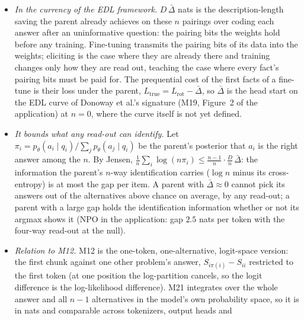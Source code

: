 \documentclass[11pt]{article}
\newenvironment{steps}{\begin{itemize}[nosep,leftmargin=1.2em,topsep=2pt]}{\end{itemize}}
\begin{document}
\begin{enumerate}[label=\textbf{M\arabic*}, leftmargin=*, itemsep=1.2em, resume]
{\begin{steps}
pairing is cheaper than its question and its answer predict). The gap is therefore invariant to
anything the parent does with a question alone (a prompt-dependent shift, an output broken on this
format) or with an answer alone (vocabulary, length, frequency, a penalty on the forbidden
answers); the four rotations run are a Monte-Carlo sample of $\bar\Delta$, their spread the noise
level. The identity is checked on a random model through the rotation and loss code
(\texttt{test\_rotation\_gap\_is\_the\_off\_diagonal\_mean}).
\item \emph{In the currency of the EDL framework.} $D\,\bar\Delta$ nats is the description-length
saving the parent already achieves on these $n$ pairings over coding each answer after an
uninformative question: the pairing bits the weights hold before any training. Fine-tuning
transmits the pairing bits of its data into the weights; eliciting is the case where they are
already there and training changes only how they are read out, teaching the case where every
fact's pairing bits must be paid for. The prequential cost of the first facts of a fine-tune is
their loss under the parent, $L_{\mathrm{true}}=L_{\mathrm{rot}}-\bar\Delta$, so $\bar\Delta$ is
the head start on the EDL curve of Donoway et al.'s signature (M19, Figure~2 of the application)
at $n=0$, where the curve itself is not yet defined.
\item \emph{It bounds what any read-out can identify.} Let
$\pi_i=p_\theta(a_i\mid q_i)/\sum_jp_\theta(a_j\mid q_i)$ be the parent's posterior that $a_i$ is
the right answer among the $n$. By Jensen,
$\frac1n\sum_i\log(n\pi_i)\le\frac{n-1}{n}\cdot\frac Dn\,\bar\Delta$: the information the
parent's $n$-way identification carries ($\log n$ minus its cross-entropy) is at most the gap per
item. A parent with $\bar\Delta\approx0$ cannot pick its answers out of the alternatives above
chance on average, by any read-out; a parent with a large gap holds the identification
information whether or not its argmax shows it (NPO in the application: gap $2.5$ nats per token
with the four-way read-out at the null).
\item \emph{Relation to M12.} M12 is the one-token, one-alternative, logit-space version: the
first chunk against one other problem's answer, $S_{i\pi(i)}-S_{ii}$ restricted to the first
token (at one position the log-partition cancels, so the logit difference is the log-likelihood
difference). M21 integrates over the whole answer and all $n-1$ alternatives in the model's own
probability space, so it is in nats and comparable across tokenizers, output heads and

\end{steps}}
\end{enumerate}
\end{document}
